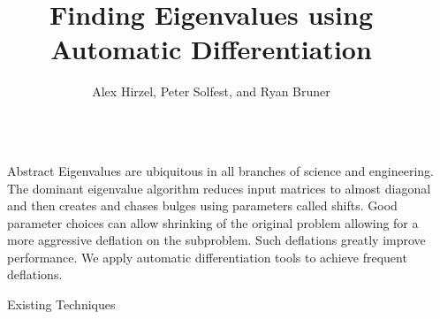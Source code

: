 \documentclass[final]{beamer}
\title{Finding Eigenvalues using Automatic Differentiation} %
\author{Alex Hirzel, Peter Solfest, and Ryan Bruner} %
\institute{Michigan Technological University} %
\newlength{\sepwid}
\newlength{\onecolwid}
\begin{document}

\setlength{\belowcaptionskip}{2ex} %
\setlength\belowdisplayshortskip{2ex} %

\begin{frame}[t] %

\begin{columns}[t] %

\begin{column}{\sepwid}\end{column} %

\begin{column}{\onecolwid} %


\begin{block}{Abstract}
{
\small
Eigenvalues are ubiquitous in all branches of science and engineering. The
dominant eigenvalue algorithm reduces input matrices to almost diagonal and then
creates and chases bulges using parameters called shifts. Good parameter choices
can allow shrinking of the original problem allowing for a more aggressive
deflation on the subproblem. Such deflations greatly improve performance. We
apply automatic differentiation tools to achieve frequent deflations.
}
\end{block}


\begin{block}{Existing Techniques}


\end{block}
\end{column}
\end{columns}
\end{frame}
\end{document}
